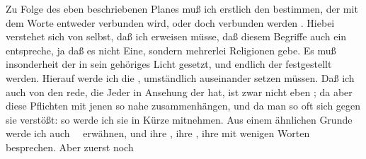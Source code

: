 \cleardoublepage{}

\cleardoublepage{}
Zu Folge des eben beschriebenen Planes muß ich erstlich den  bestimmen, der mit dem Worte  entweder  verbunden wird, oder doch verbunden werden . Hiebei verstehet sich von selbst, daß ich erweisen müsse, daß diesem Begriffe auch ein  entspreche, ja daß es nicht Eine, sondern mehrerlei Religionen gebe. Es muß insonderheit der  in sein gehöriges Licht gesetzt, und endlich der  festgestellt werden. Hierauf werde ich die , umständlich auseinander setzen müssen. Daß ich auch von den  rede, die Jeder in Ansehung der  hat, ist zwar nicht eben ; da aber diese Pflichten mit jenen so nahe zusammenhängen, und da man so oft sich gegen sie verstößt: so werde ich sie in Kürze mitnehmen. Aus einem ähnlichen Grunde werde ich auch ~\ erwähnen, und ihre , ihre , ihre  mit wenigen Worten besprechen. Aber zuerst noch


